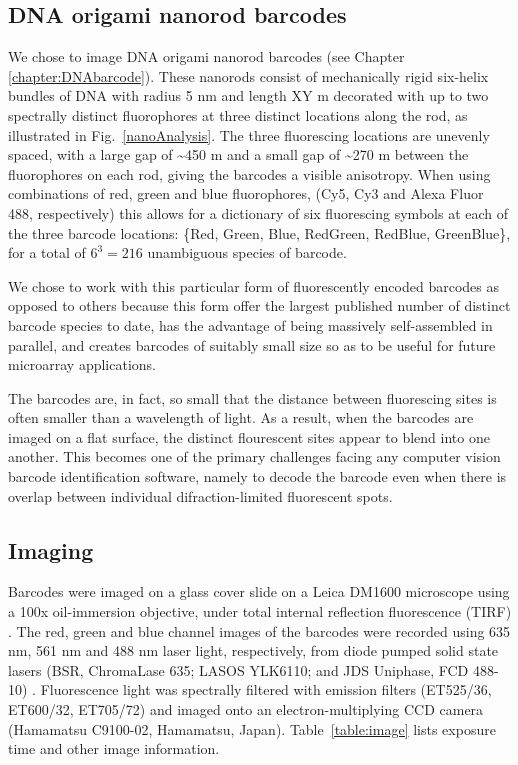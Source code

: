 \subsection{DNA origami nanorod barcodes}
We chose to image DNA origami nanorod barcodes (see Chapter \ref{chapter:DNAbarcode}). These nanorods consist of mechanically rigid six-helix bundles of DNA with radius 5 nm and length XY \textmu m decorated with  up to two spectrally distinct fluorophores at three distinct locations along the rod, as illustrated in Fig.~\ref{nanoAnalysis}. The three fluorescing locations are unevenly spaced, with a large gap of \textasciitilde 450 \textmu m and a small gap of \textasciitilde 270 \textmu m  between the fluorophores on each rod, giving the barcodes a visible anisotropy. When using combinations of red, green and blue fluorophores, (Cy5, Cy3 and Alexa Fluor 488, respectively) this allows for a dictionary of six fluorescing symbols at each of the three barcode locations: \{Red, Green, Blue, RedGreen, RedBlue, GreenBlue\}, for a total of $6^{3}=216$  unambiguous species of barcode.

We chose to work with this particular form of fluorescently encoded barcodes as opposed to others because this form offer the largest published number of distinct barcode species to date, has the advantage of being massively self-assembled in parallel, and creates barcodes of suitably small  size so as to be useful for future microarray applications. 

The barcodes are, in fact, so small that the distance between fluorescing sites is often smaller than a wavelength of light. As a result, when the barcodes are imaged on a flat surface, the distinct flourescent sites appear to blend into one another. This becomes one of the primary challenges facing any computer vision barcode identification software, namely to  decode the barcode even when there is overlap between individual difraction-limited fluorescent spots. 

\subsection{Imaging}
Barcodes were imaged on a glass cover slide on a Leica DM1600 microscope using a 100x oil-immersion objective,  under total internal reflection fluorescence (TIRF) . 
The red, green and blue channel images of the barcodes were  recorded using  635 nm, 561 nm and 488 nm laser light, respectively, from diode pumped solid state lasers (BSR, ChromaLase 635; LASOS YLK6110; and JDS Uniphase, FCD 488-10) . Fluorescence light was spectrally filtered with emission filters (ET525/36, ET600/32, ET705/72) and imaged onto an electron-multiplying CCD camera (Hamamatsu C9100-02, Hamamatsu, Japan). Table~\ref{table:image} lists exposure time and other image information.

